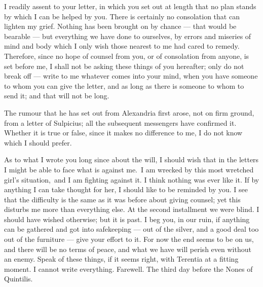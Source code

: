 

 I readily assent to your letter, in which you set out at length that no plan stands by which I can be helped by you. There is certainly no consolation that can lighten my grief. Nothing has been brought on by chance --- that would be bearable --- but everything we have done to ourselves, by errors and miseries of mind and body which I only wish those nearest to me had cared to remedy. Therefore, since no hope of counsel from you, or of consolation from anyone, is set before me, I shall not be asking these things of you hereafter; only do not break off --- write to me whatever comes into your mind, when you have someone to whom you can give the letter, and as long as there is someone to whom to send it; and that will not be long.

 The rumour that he has set out from Alexandria first arose, not on firm ground, from a letter of Sulpicius; all the subsequent messengers have confirmed it. Whether it is true or false, since it makes no difference to me, I do not know which I should prefer.

 As to what I wrote you long since about the will, \dag I should wish that in the letters I might be able to face what is against me.\dag\ I am wrecked by this most wretched girl's \dag situation,\dag\ and I am fighting against it. I think nothing was ever like it. If by anything I can take thought for her, I should like to be reminded by you. I see that the difficulty is the same as it was before about giving counsel; yet this disturbs me more than everything else. At the second installment we were blind. I should have wished otherwise; but it is past. I beg you, in our ruin, if anything can be gathered and got into safekeeping --- out of the silver, and a good deal too out of the furniture --- give your effort to it. For now the end seems to be on us, and there will be no terms of peace, and what we have will perish even without an enemy. Speak of these things, if it seems right, with Terentia at a fitting moment. I cannot write everything. Farewell. The third day before the Nones of Quintilis.
